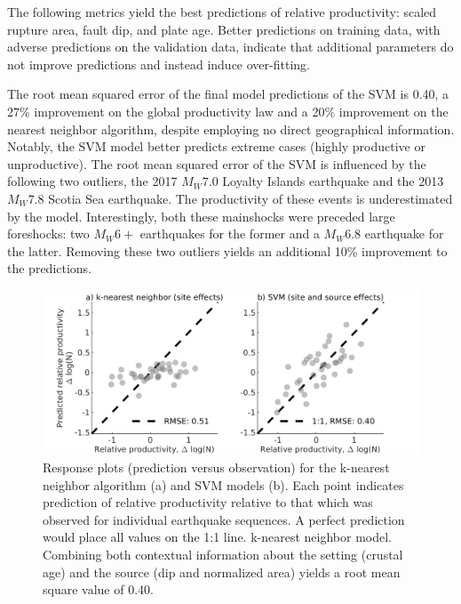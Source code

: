 \documentclass[draft, jgrga]{agujournal2018}
\begin{document}
    The following metrics yield the best predictions of relative productivity: scaled rupture area, fault dip, and plate age. Better predictions on training data, with adverse predictions on the validation data, indicate that additional parameters do not improve predictions and instead induce over-fitting. 
    
    The root mean squared error of the final model predictions of the SVM is 0.40, a 27\% improvement on the global productivity law and a 20\% improvement on the nearest neighbor algorithm, despite employing no direct geographical information. Notably, the SVM model better predicts extreme cases (highly productive or unproductive). The root mean squared error of the SVM is influenced by the following two outliers, the 2017 $M_W7.0$ Loyalty Islands earthquake and the 2013 $M_W7.8$ Scotia Sea earthquake. The productivity of these events is underestimated by the model. Interestingly, both these mainshocks were preceded large foreshocks: two $M_W6+$ earthquakes for the former and a $M_W6.8$ earthquake for the latter. Removing these two outliers yields an additional 10\% improvement to the predictions.
    
    \begin{figure}
        \centering
        \includegraphics{figures/response.png}
        \caption{Response plots (prediction versus observation) for the k-nearest neighbor algorithm (a) and SVM models (b). Each point indicates prediction of relative productivity relative to that which was observed for individual earthquake sequences. A perfect prediction would place all values on the 1:1 line.  k-nearest neighbor model. Combining both contextual information about the setting (crustal age) and the source (dip and normalized area) yields a root mean square value of 0.40.}
        \label{fig:response}
    \end{figure}
    
\end{document}
